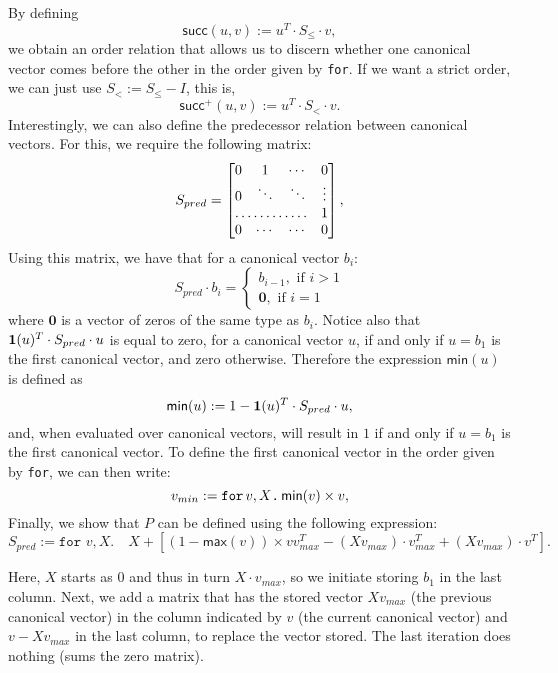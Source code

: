 By defining $$\mathsf{succ}(u,v) := u^T\cdot S_{\leq} \cdot v,$$
we obtain an order relation that allows us to discern whether one canonical vector comes before the other in the order given by \texttt{for}. If we want a strict order, we can just use $S_< := S_{\leq} - I$, this is, $$\mathsf{succ}^+(u,v) := u^T\cdot S_{<} \cdot v.$$
Interestingly, we can also define the predecessor relation between canonical vectors. For this, we require the following matrix:
\[
S_{pred} = \begin{bmatrix}
    0 & 1 & \cdots &  0 \\
    0 & \ddots & \ddots & \vdots \\
    \hdotsfor{3} & 1 \\
    0 & \cdots & \cdots & 0
\end{bmatrix},
\]
Using this matrix, we have that for a canonical vector $b_i$:
\[
S_{pred}\cdot b_i=\begin{cases}
               b_{i-1}, \text{ if } i > 1 \\
              \mathbf{0}, \text{ if } i = 1
            \end{cases}
\]
where $\mathbf{0}$ is a vector of zeros of the same type as $b_i$. Notice also that $\mathbf{1}(u)^T\cdot S_{pred} \cdot u$ is equal to zero, for a canonical vector $u$, if and only if $u = b_1$ is the first canonical vector, and zero otherwise.
Therefore the expression $\mathsf{min}(u)$ is defined as $$\mathsf{min}(u) := 1 - \mathbf{1}(u)^T\cdot S_{pred} \cdot u,$$ and, when evaluated over canonical vectors, will result in $1$ if and only if $u=b_1$ is the first canonical vector.
To define the first canonical vector in the order given by \texttt{for}, we can then write:
$$v_{min} := \texttt{for}\, v,X \texttt{.}\, \mathsf{min}(v)\times v,$$
Finally, we show that $P$ can be defined using the following \langfor expression:
$$S_{pred}:= \texttt{for }v,X.\quad X + \left[ (1 - \mathsf{max}(v))\times vv_{max}^T - (Xv_{max})\cdot v_{max}^T + (Xv_{max})\cdot v^T\right].$$

Here, $X$ starts as 0 and thus in turn $X\cdot v_{max}$, so we initiate storing $b_1$ in the last column. Next, we add a matrix that has the stored vector $Xv_{max}$ (the previous canonical vector) in the column indicated by $v$ (the current canonical vector) and $v-Xv_{max}$ in the last column, to replace the vector stored.
The last iteration does nothing (sums the zero matrix).